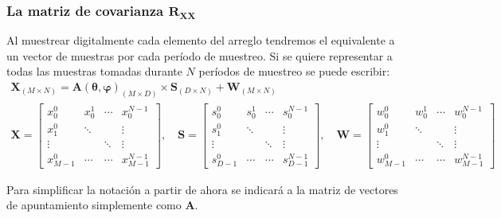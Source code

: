 \subsubsection{La matriz de covarianza $\mathbf{R_{XX}}$}

Al muestrear digitalmente cada elemento del arreglo tendremos el equivalente a un vector de muestras por cada período de muestreo. Si se quiere representar a todas las muestras tomadas durante $N$ períodos de muestreo se puede escribir:
\begin{gather}
    \mathbf{X}_{(M\times N)} = \mathbf{A(\theta,\varphi)}_{(M\times D)}\times \mathbf{S}_{(D\times N)} + \mathbf{W}_{(M\times N)}    \label{eq:doaest_x}\\
    \mathbf{X}=
    \begin{bmatrix}
        x_0^0     & x_0^1  & \cdots & x_0^{N-1}     \\
        x_1^0     & \ddots &        & \vdots        \\
        \vdots    &        & \ddots & \vdots        \\
        x_{M-1}^0 & \cdots & \cdots & x_{M-1}^{N-1}
    \end{bmatrix},\quad
    \mathbf{S}=\begin{bmatrix}
        s_0^0     & s_0^1  & \cdots & s_0^{N-1}     \\
        s_1^0     & \ddots &        & \vdots        \\
        \vdots    &        & \ddots & \vdots        \\
        s_{D-1}^0 & \cdots & \cdots & s_{D-1}^{N-1}
    \end{bmatrix},\quad
    \mathbf{W}=\begin{bmatrix}
        w_0^0     & w_0^1  & \cdots & w_0^{N-1}     \\
        w_1^0     & \ddots &        & \vdots        \\
        \vdots    &        & \ddots & \vdots        \\
        w_{M-1}^0 & \cdots & \cdots & w_{M-1}^{N-1}
    \end{bmatrix}\nonumber
\end{gather}

Para simplificar la notación a partir de ahora se indicará a la matriz de vectores de apuntamiento simplemente como $\mathbf{A}$.

